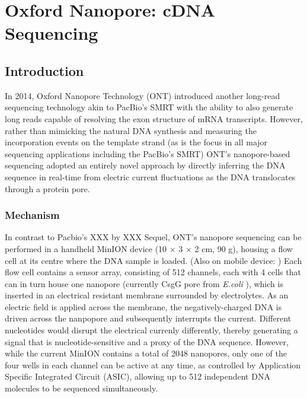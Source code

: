 \clearpage

\section{Oxford Nanopore: cDNA Sequencing}

\subsection{Introduction}
In 2014, Oxford Nanopore Technology (ONT) introduced another long-read sequencing technology akin to PacBio's SMRT with the ability to also generate long reads capable of resolving the exon structure of mRNA transcripts. However, rather than mimicking the natural DNA synthesis and measuring the incorporation events on the template strand (as is the focus in all major sequencing applications including the PacBio's SMRT) ONT's nanopore-based sequencing adopted an entirely novel approach by directly inferring the DNA sequence in real-time from electric current fluctuations as the DNA translocates through a protein pore. 

\subsubsection{Mechanism}
In contrast to Pacbio's XXX by XXX Sequel, ONT's nanopore sequencing can be performed in a handheld MinION device (10 × 3 × 2 cm, 90 g), housing a flow cell at its centre where the DNA sample is loaded. (Also on mobile device: \cite{Samarakoon2020}) Each flow cell contains a sensor array, consisting of 512 channels, each with 4 cells that can in turn house one nanopore (currently CsgG pore from \textit{E.coli} \cite{Goyal2014}), which is inserted in an electrical resistant membrane surrounded by electrolytes. As an electric field is applied across the membrane, the negatively-charged DNA is driven across the nanpopore and subsequently interrupts the current. Different nucleotides would disrupt the electrical currenly differently, thereby generating a signal that is nucleotide-sensitive and a proxy of the DNA sequence. However, while the current MinION contains a total of 2048 nanopores, only one of the four wells in each channel can be active at any time, as controlled by Application Specific Integrated Circuit (ASIC), allowing up to 512 independent DNA molecules to be sequenced simultaneously.

